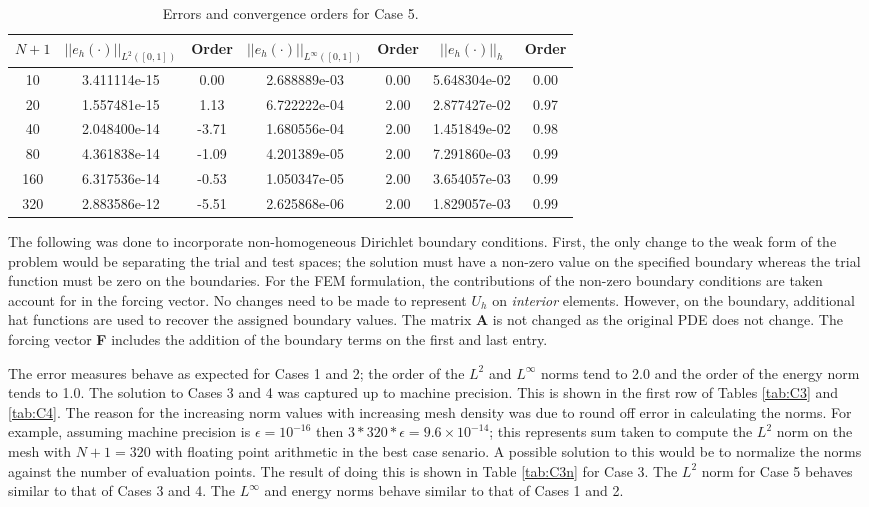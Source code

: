 \documentclass[a4paper, 12pt]{article}
\begin{document}
\begin{table}[!ht]
\caption{Errors and convergence orders for Case 5.}
\vspace{0.1in}
\centering
\begin{tabular}{|c|c|c| c| c| c| c|}
\hline
 $N+1$&  $||e_h(\cdot)||_{L^2([0,1])}$ & Order  & $||e_h(\cdot)||_{L^\infty([0,1])}$ & Order& $||e_h(\cdot)||_h$& Order \\
 \hline
     10  & 3.411114e-15 &  0.00 & 2.688889e-03 & 0.00 & 5.648304e-02 & 0.00\\
     20  & 1.557481e-15 &  1.13 & 6.722222e-04 & 2.00 & 2.877427e-02 & 0.97\\
     40  & 2.048400e-14 & -3.71 & 1.680556e-04 & 2.00 & 1.451849e-02 & 0.98\\
     80  & 4.361838e-14 & -1.09 & 4.201389e-05 & 2.00 & 7.291860e-03 & 0.99\\
     160 & 6.317536e-14 & -0.53 & 1.050347e-05 & 2.00 & 3.654057e-03 & 0.99\\
     320 & 2.883586e-12 & -5.51 & 2.625868e-06 & 2.00 & 1.829057e-03 & 0.99\\
\hline
\end{tabular}
\label{tab:C5}
\end{table}

\noindent
The following was done to incorporate non-homogeneous Dirichlet boundary conditions.
First, the only change to the weak form of the problem would be separating the 
trial and test spaces; the solution must have a non-zero value on the specified 
boundary whereas the trial function must be zero on the boundaries.
For the FEM formulation, the contributions of the non-zero boundary
conditions are taken account for in the forcing vector. 
No changes need to be made to represent $U_h$ on \emph{interior} elements.
However, on the boundary, additional hat functions are used to recover the
assigned boundary values.
The matrix \textbf{A} is not changed as the original PDE does not change. 
The forcing vector \textbf{F} includes the addition of the boundary terms
on the first and last entry.

The error measures behave as expected for Cases 1 and 2; 
the order of the $L^2$ and $L^\infty$ norms tend to 2.0 
and the order of the energy norm tends to 1.0.
The solution to Cases 3 and 4 was captured up to machine precision.
This is shown in the first row of Tables \ref{tab:C3} and \ref{tab:C4}.
The reason for the increasing norm values with increasing mesh density 
was due to round off error in calculating the norms.
For example, assuming machine precision is $\epsilon = 10^{-16}$ 
then $3*320*\epsilon = 9.6 \times 10^{-14}$; this represents sum taken
to compute the $L^2$ norm on the mesh with $N+1=320$ with
floating point arithmetic in the best case senario.
A possible solution to this would be to normalize the norms 
against the number of evaluation points. 
The result of doing this is shown in Table \ref{tab:C3n} for Case 3.
The $L^2$ norm for Case 5 behaves similar to that of Cases 3 and 4.
The $L^\infty$ and energy norms behave similar to that of Cases 1 and 2.
\end{document}
